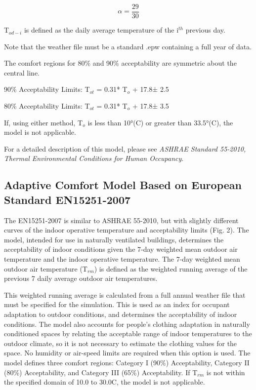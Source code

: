 \begin{equation}
\alpha  = \frac{{29}}{{30}}
\end{equation}

T\(_{od-i}\) is defined as the daily average temperature of the i\(^{th}\) previous day.

Note that the weather file must be a standard .epw containing a full year of data.

The comfort regions for 80\% and 90\% acceptability are symmetric about the central line.

90\% Acceptability Limits: T\(_{ot}\) = 0.31* T\(_{o}\) + 17.8± 2.5

80\% Acceptability Limits: T\(_{ot}\) = 0.31* T\(_{o}\) + 17.8± 3.5

If, using either method, T\(_{o}\) is less than 10°(C) or greater than 33.5°(C), the model is not applicable.

For a detailed description of this model, please see \emph{ASHRAE Standard 55-2010, Thermal Environmental Conditions for Human Occupancy}.

\subsection{Adaptive Comfort Model Based on European Standard EN15251-2007}\label{adaptive-comfort-model-based-on-european-standard-en15251-2007}

The EN15251-2007 is similar to ASHRAE 55-2010, but with slightly different curves of the indoor operative temperature and acceptability limits (Fig. 2). The model, intended for use in naturally ventilated buildings, determines the acceptability of indoor conditions given the 7-day weighted mean outdoor air temperature and the indoor operative temperature. The 7-day weighted mean outdoor air temperature (T\(_{rm}\)) is defined as the weighted running average of the previous 7 daily average outdoor air temperatures.

This weighted running average is calculated from a full annual weather file that must be specified for the simulation. This is used as an index for occupant adaptation to outdoor conditions, and determines the acceptability of indoor conditions. The model also accounts for people's clothing adaptation in naturally conditioned spaces by relating the acceptable range of indoor temperatures to the outdoor climate, so it is not necessary to estimate the clothing values for the space. No humidity or air-speed limits are required when this option is used. The model defines three comfort regions: Category I (90\%) Acceptability, Category II (80\%) Acceptability, and Category III (65\%) Acceptability. If T\(_{rm}\) is not within the specified domain of 10.0 to 30.0C, the model is not applicable.

